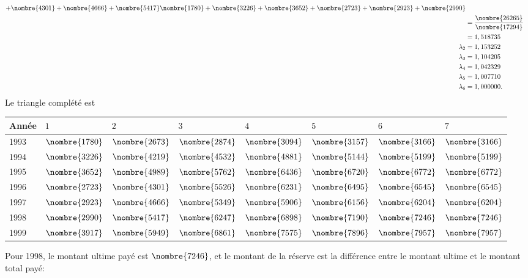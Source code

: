 \begin{exercice}
\begin{sol}
\begin{enumerate}
\begin{align*}
{                    +\nombre{4301} + \nombre{4666} + \nombre{5417}}{\nombre{1780} +
                    \nombre{3226} + \nombre{3652} + \nombre{2723} + \nombre{2923} + \nombre{2990}}\\
                  &=  \frac{\nombre{26265}}{\nombre{17294}}\\
                  &= 1,518735\\
        \lambda_2 &=  1,153252\\
        \lambda_3 &= 1,104205\\
        \lambda_4 &=  1,042329\\
        \lambda_5 &= 1,007710\\
        \lambda_6 &= 1,000000.
      \end{align*}
      Le triangle complété est
      \begin{center}
        \begin{tabular}{|l|l l l l l l l|}\hline
          Année & $1$ & $2$ & $3$ & $4$ & $5$ & $6$ & $7$\\ \hline
          1993& $\nombre{1780}$& $\nombre{2673}$& $\nombre{2874}$& $\nombre{3094}$& $\nombre{3157}$& $\nombre{3166}$& $\nombre{3166}$ \\
          1994& $\nombre{3226}$& $\nombre{4219}$& $\nombre{4532}$& $\nombre{4881}$& $\nombre{5144}$& $\nombre{5199}$& $\nombre{5199}$ \\
          1995& $\nombre{3652}$& $\nombre{4989}$& $\nombre{5762}$& $\nombre{6436}$& $\nombre{6720}$& $\nombre{6772}$& $\nombre{6772}$ \\
          1996& $\nombre{2723}$& $\nombre{4301}$& $\nombre{5526}$& $\nombre{6231}$& $\nombre{6495}$& $\nombre{6545}$& $\nombre{6545}$ \\
          1997& $\nombre{2923}$& $\nombre{4666}$& $\nombre{5349}$& $\nombre{5906}$& $\nombre{6156}$& $\nombre{6204}$& $\nombre{6204}$ \\
          1998& $\nombre{2990}$& $\nombre{5417}$& $\nombre{6247}$& $\nombre{6898}$& $\nombre{7190}$& $\nombre{7246}$& $\nombre{7246}$ \\
          1999& $\nombre{3917}$& $\nombre{5949}$& $\nombre{6861}$& $\nombre{7575}$& $\nombre{7896}$& $\nombre{7957}$& $\nombre{7957}$\\\hline
        \end{tabular}
      \end{center}
      Pour 1998, le montant ultime payé est $\nombre{7246}$, et le
      montant de la réserve est la différence entre le montant ultime
      et le montant total payé:

\end{enumerate}
\end{sol}
\end{exercice}
